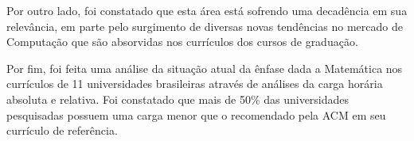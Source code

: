 \documentclass[conference]{IEEEtran}
\begin{document}
	Por outro lado, foi constatado que esta área está sofrendo uma decadência em sua relevância, em parte pelo surgimento de diversas novas tendências no mercado de Computação que são absorvidas nos currículos dos cursos de graduação.
	
	Por fim, foi feita uma análise da situação atual da ênfase dada a Matemática nos currículos de 11 universidades brasileiras através de análises da carga horária absoluta e relativa. Foi constatado que mais de 50\% das universidades pesquisadas possuem uma carga menor que o recomendado pela ACM em seu currículo de referência.

%
%



%
%
\end{document}
